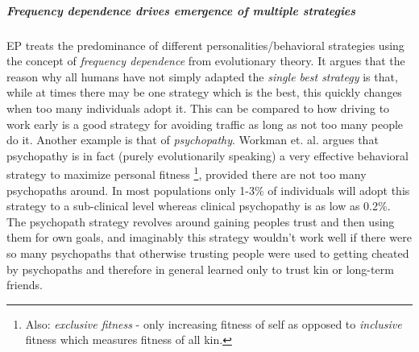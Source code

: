 \subparagraph*{Frequency dependence drives emergence of multiple strategies}
EP treats the predominance of different personalities/behavioral strategies using the concept of \textit{frequency dependence} from evolutionary theory. It argues that the reason why all humans have not simply adapted the \textit{single best strategy} is that, while at times there may be one strategy which is the best, this quickly changes when too many individuals adopt it. This can be compared to how driving to work early is a good strategy for avoiding traffic as long as not too many people do it. Another example is that of \textit{psychopathy}. Workman et. al. argues that psychopathy is in fact (purely evolutionarily speaking) a very effective behavioral strategy to maximize personal fitness \footnote{Also: \textit{exclusive fitness} - only increasing fitness of self as opposed to \textit{inclusive} fitness which measures fitness of all kin.}, provided there are not too many psychopaths around. In most populations only 1-3\% of individuals will adopt this strategy to a sub-clinical level whereas clinical psychopathy is as low as 0.2\%. The psychopath strategy revolves around gaining peoples trust and then using them for own goals, and imaginably this strategy wouldn't work well if there were so many psychopaths that otherwise trusting people were used to getting cheated by psychopaths and therefore in general learned only to trust kin or long-term friends.

